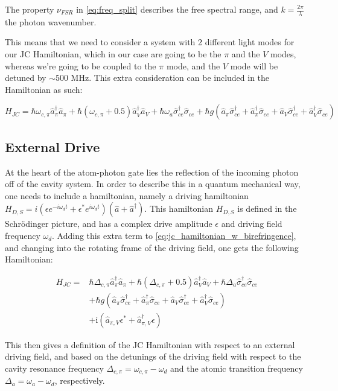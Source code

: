 The property $\nu_{FSR}$ in \eqref{eq:freq_split} describes the free spectral range, and $k=\frac{2\pi}{\lambda}$ the photon wavenumber.

This means that we need to consider a system with 2 different light modes for our JC Hamiltonian, which in our case are going to be the $\pi$ and the $V$ modes, whereas we're going to be coupled to the $\pi$ mode, and the $V$ mode will be detuned by $\sim\text{500 MHz}$. This extra consideration can be included in the Hamiltonian as such:

\begin{equation}
	H_{JC} = \hbar\omega_{c,\pi}\hat{a}_\pi^\dag\hat{a}_\pi + \hbar(\omega_{c,\pi}+0.5)\hat{a}_V^\dag\hat{a}_V + \hbar\omega_{a} \hat{\sigma}_{ce}^\dag\hat{\sigma}_{ce} + \hbar g(\hat{a}_\pi\hat{\sigma}_{ce}^\dag + \hat{a}_\pi^\dag\hat{\sigma}_{ce} + \hat{a}_V\hat{\sigma}_{ce}^\dag + \hat{a}_V^\dag\hat{\sigma}_{ce})
	\label{eq:jc_hamiltonian_w_birefringence}
\end{equation}

\subsection{External Drive}

At the heart of the atom-photon gate lies the reflection of the incoming photon off of the cavity system. In order to describe this in a quantum mechanical way, one needs to include a hamiltonian, namely a driving hamiltonian $H_{D,S}=i(\epsilon e^{-i\omega_d t} + \epsilon^{*}e^{i\omega_d t})(\hat{a} + \hat{a}^\dagger)$. This hamiltonian $H_{D,S}$ is defined in the Schrödinger picture, and has a complex drive amplitude $\epsilon$ and driving field frequency $\omega_d$. Adding this extra term to \eqref{eq:jc_hamiltonian_w_birefringence}, and changing into the rotating frame of the driving field, one gets the following Hamiltonian:

\begin{equation}
	\begin{split}
		H_{JC} = & \hbar\Delta_{c,\pi}\hat{a}_\pi^{\dagger}\hat{a}_\pi + \hbar\left(\Delta_{c,\pi}+0.5\right)\hat{a}_V^{\dagger}\hat{a}_V + \hbar\Delta_{a} \hat{\sigma}_{ce}^{\dagger}\hat{\sigma}_{ce}  \\
		         & + \hbar g \left( \hat{a}_\pi\hat{\sigma}_{ce}^{\dagger} + \hat{a}_\pi^{\dagger}\hat{\sigma}_{ce} + \hat{a}_V\hat{\sigma}_{ce}^{\dagger} + \hat{a}_V^{\dagger}\hat{\sigma}_{ce} \right) \\
		         & + \mathrm{i}\left(\hat{a}_{\pi,V}\epsilon^{*} + \hat{a}_{\pi,V}^{\dagger} \epsilon\right)
	\end{split}
	\label{eq:jc_hamiltonian_w_birefringence_w_drive}
\end{equation}

This then gives a definition of the JC Hamiltonian with respect to an external driving field, and based on the detunings of the driving field with respect to the cavity resonance frequency $\Delta_{c,\pi}=\omega_{c,\pi}-\omega_d$ and the atomic transition frequency $\Delta_{a}=\omega_a-\omega_d$, respectively.
